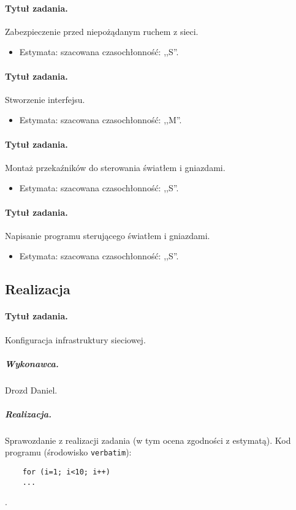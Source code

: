 	\paragraph{Tytuł zadania.} Zabezpieczenie przed niepożądanym ruchem z sieci.
	\begin{itemize}
		\item Estymata: szacowana czasochłonność: ,,S''.
	\end{itemize}
	
	\paragraph{Tytuł zadania.} Stworzenie interfejsu.
	\begin{itemize}
		\item Estymata: szacowana czasochłonność: ,,M''.
	\end{itemize}
	
	\paragraph{Tytuł zadania.} Montaż przekaźników do sterowania światłem i gniazdami.
	\begin{itemize}
		\item Estymata: szacowana czasochłonność: ,,S''.
	\end{itemize}
	
	\paragraph{Tytuł zadania.} Napisanie programu sterującego światłem i gniazdami.
	\begin{itemize}
		\item Estymata: szacowana czasochłonność: ,,S''.
	\end{itemize}


	\subsection{Realizacja}
	
	\paragraph{Tytuł zadania.} Konfiguracja infrastruktury sieciowej.
	\subparagraph{Wykonawca.} Drozd Daniel.
	\subparagraph{Realizacja.} Sprawozdanie z realizacji zadania (w tym ocena zgodności z estymatą). Kod programu (środowisko \texttt{verbatim}): \begin{verbatim}
	for (i=1; i<10; i++)
	...
	\end{verbatim}.
	
